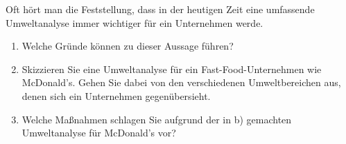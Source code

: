 Oft hört man die Feststellung, dass in der heutigen Zeit eine umfassende Umweltanalyse immer wichtiger für ein Unternehmen werde.

\begin{enumerate}[label=\alph*)]
    \item Welche Gründe können zu dieser Aussage führen?
    \item Skizzieren Sie eine Umweltanalyse für ein Fast-Food-Unternehmen wie McDonald’s. Gehen Sie dabei von den verschiedenen Umweltbereichen aus, denen sich ein Unternehmen gegenübersieht.
    \item Welche Maßnahmen schlagen Sie aufgrund der in b) gemachten Umweltanalyse für McDonald’s vor?
\end{enumerate}

